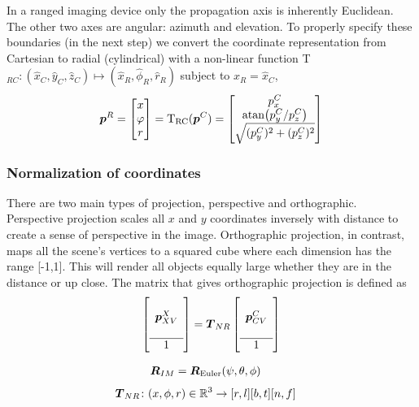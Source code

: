 
In a ranged imaging device only the propagation axis is inherently Euclidean. The other two axes are angular: azimuth and elevation. To properly specify these boundaries (in the next step) we convert the coordinate representation from Cartesian to radial (cylindrical) with a non-linear function T$_{RC}\colon (\hat{x}_C,\hat{y}_C,\hat{z}_C) \mapsto (\hat{x}_R,\hat{\phi}_R,\hat{r}_R)$ subject to $\hat{x}_R=\hat{x}_C$,
%
\begin{align}\label{eq_T_RC}
\dvec{p}^R
= \bmat{x\\\varphi\\r}
= \mathrm{T_{RC}}(\dvec{p}^C)
= \bmat{{p}_x^C\\
\text{atan}\big({p}_y^C / {p}_z^C\big)\\
\sqrt{({p}_y^C)^2 + ({p}_z^C)^2}
}
\end{align}
%


\subsubsection{Normalization of coordinates}

There are two main types of projection, perspective and orthographic. Perspective projection scales all $x$ and $y$ coordinates inversely with distance to create a sense of perspective in the image. Orthographic projection, in contrast, maps all the scene's vertices to a squared cube where each dimension has the range [-1,1]. This will render all objects equally large whether they are in the distance or up close. The matrix that gives orthographic projection is defined as
%
\begin{align}
\left[\begin{array}{c}
\\\boldsymbol{p}_{XV}^{X}\\\\\hline 1
\end{array}\right]
= \boldsymbol{T}_{NR}
\left[\begin{array}{c}
\\\boldsymbol{p}_{CV}^{C}\\\\\hline 1
\end{array}\right]
\end{align}
%

\begin{align}
\dvec{R}_{IM} &= \dvec{R}_{\mathrm{Euler}}(\psi,\theta,\phi)\label{eq_R_IM}
\end{align}
\begin{align}
\boldsymbol{T}_{NR}&\colon (x,\phi,r)\in\mathbb{R}^3 \to [r,l][b,t][n,f]
\end{align}

